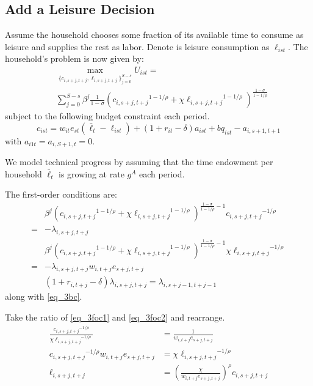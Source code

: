 \documentclass[letterpaper,12pt]{article}
\theoremstyle{definition}
\numberwithin{equation}{section}
\begin{document}
\begin{spacing}{1.5}
\section{Add a Leisure Decision}
	Assume the household chooses some fraction of its available time to consume as leisure and supplies the rest as labor.  Denote is leisure consumption as $\ell_{ist}$.  The household's problem is now given by:
	\begin{equation}
		\begin{split}
		& \max_{\{c_{i,s+j,t+j},\ell_{i,s+j,t+j}\}_{j=0}^{S-s}} U_{ist} = \\
		& \sum_{j=0}^{S-s} \beta^j \frac{1}{1-\sigma} \left( {c_{i,s+j,t+j}}^{1-1/\rho} + \chi {\ell_{i,s+j,t+j}}^{1-1/\rho}\right)^{\tfrac{{1-\sigma}}{1-1/\rho}}  \nonumber
		\end{split}
	\end{equation}
	subject to the following budget constraint each period.
	\begin{equation} \label{eq_3bc}
		c_{ist} = w_{it} e_{st} (\bar \ell_t -\ell_{ist}) + (1+r_{it}-\delta)a_{ist} + bq_{ist} - a_{i,s+1,t+1}
	\end{equation}
	with $a_{i1t} = a_{i,S+1,t} = 0$.

	We model technical progress by assuming that the time endowment per household $\bar \ell_t$ is growing at rate $g^A$ each period.

	The first-order conditions are:
	\begin{align}
		& \beta^j \left( {c_{i,s+j,t+j}}^{1-1/\rho} + \chi {\ell_{i,s+j,t+j}}^{1-1/\rho}\right)^{\tfrac{{1-\sigma}}{1-1/\rho}-1} {c_{i,s+j,t+j}}^{-1/\rho}  \nonumber \\ = &  - \lambda_{i,s+j,t+j}  \label{eq_3foc1} \\
		& \beta^j \left( {c_{i,s+j,t+j}}^{1-1/\rho} + \chi {\ell_{i,s+j,t+j}}^{1-1/\rho}\right)^{\tfrac{{1-\sigma}}{1-1/\rho}-1} \chi {\ell_{i,s+j,t+j}}^{-1/\rho} \nonumber \\ = & - \lambda_{i,s+j,t+j} w_{i,t+j} e_{s+j,t+j} \label{eq_3foc2} \\
        & (1+r_{i,t+j}-\delta) \lambda_{i,s+j,t+j} = \lambda_{i,s+j-1,t+j-1} \label{eq_3foc3}
	\end{align}	
	along with \eqref{eq_3bc}.

	Take the ratio of \eqref{eq_3foc1} and \eqref{eq_3foc2} and rearrange.
	\begin{align}
		\frac{{c_{i,s+j,t+j}}^{-1/\rho}} {\chi {\ell_{i,s+j,t+j}}^{-1/\rho}} \nonumber & = \frac{1} {w_{i,t+j} e_{s+j,t+j}} \nonumber \\
		{c_{i,s+j,t+j}}^{-1/\rho} w_{i,t+j} e_{s+j,t+j} & = \chi {\ell_{i,s+j,t+j}}^{-1/\rho} \nonumber \\
		\ell_{i,s+j,t+j} & = \left(\frac{\chi} {w_{i,t+j} e_{s+j,t+j}}\right)^{\rho} c_{i,s+j,t+j} \label{eq_3elldef}
	\end{align}	


\end{spacing}
\end{document}
